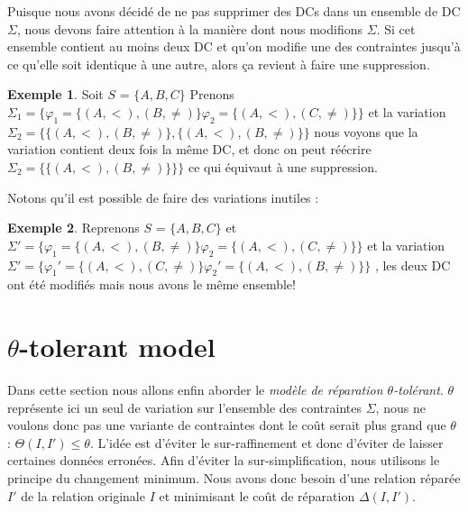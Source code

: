 \documentclass[letterpaper, 12pt]{report}
\theoremstyle{definition}
\newtheorem{myexample}{Exemple}
\begin{document}
Puisque nous avons décidé de ne pas supprimer des DCs dans un ensemble de DC $\Sigma$, nous devons faire attention à la manière dont nous modifions $\Sigma$. Si cet ensemble contient au moins deux DC et qu'on modifie une des contraintes jusqu'à ce qu'elle soit identique à une autre, alors ça revient à faire une suppression.

\begin{myexample}
Soit $S$ = $\{A,B,C\}$
Prenons $\Sigma_1 = \{ \varphi_1= \{(A,<),(B,\neq) \} \varphi_2= \{(A,<),(C,\neq) \}\}$ et la variation $ \Sigma_2 = \{ \{(A,<),(B,\neq) \} ,\{(A,<),(B,\neq) \}\}$
nous voyons que la variation contient deux fois la même DC, et donc on peut réécrire $ \Sigma_2 = \{ \{(A,<),(B,\neq) \}\}\}$ ce qui équivaut à une suppression.

\end{myexample}

Notons qu'il est possible de faire des variations inutiles :

\begin{myexample}

Reprenons $S$ = $\{A,B,C\}$
et $\Sigma' = \{ \varphi_1= \{(A,<),(B,\neq) \} \varphi_2= \{(A,<),(C,\neq) \}\}$ et la variation $\Sigma' = \{ \varphi_1'= \{(A,<),(C,\neq) \} \varphi_2'= \{(A,<),(B,\neq) \}\}$ , les deux DC ont été modifiés mais nous avons le même ensemble!
\end{myexample}
\section{$\theta$-tolerant model}

Dans cette section nous allons enfin aborder le \emph{modèle de réparation $\theta$-tolérant}. $\theta$ représente ici un seul de variation sur l'ensemble des contraintes $\Sigma$, nous ne voulons donc pas une variante de contraintes dont le coût serait plus grand que $\theta$ : $\Theta(I,I') \leq \theta$. L'idée est d'éviter le sur-raffinement et donc d'éviter de laisser certaines données erronées. Afin d'éviter la sur-simplification, nous utilisons le principe du changement minimum. Nous avons donc besoin d'une relation réparée $I'$ de la relation originale $I$ et minimisant le coût de réparation $\Delta(I,I')$.\\
\end{document}
